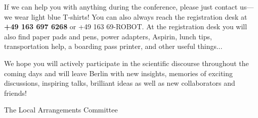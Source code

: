 If we can help you with anything during the conference, please just contact us---we wear light blue T-shirts!  You can also always reach the registration desk at {\Large \textbf{ +49 163 697 6268} or +49 163 69-ROBOT}.  At the registration desk you will also find paper pads and pens, power adapters, Aspirin, lunch tips, transportation help, a boarding pass printer, and other useful things...

We hope you will actively participate in the scientific discourse throughout the coming days and will leave Berlin with new insights, memories of exciting discussions, inspiring talks, brilliant ideas as well as new collaborators and friends!


\vspace{1cm}

The Local Arrangements Committee


\endgroup{}
\normalsize

